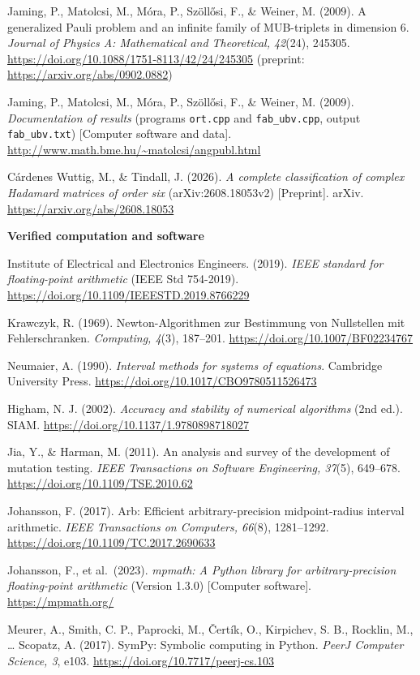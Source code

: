 \documentclass[
  11pt,
]{article}
\begin{document}
Jaming, P., Matolcsi, M., Móra, P., Szöllősi, F., \& Weiner, M. (2009).
A generalized Pauli problem and an infinite family of MUB-triplets in
dimension 6. \emph{Journal of Physics A: Mathematical and Theoretical,
42}(24), 245305. \url{https://doi.org/10.1088/1751-8113/42/24/245305}
(preprint: \url{https://arxiv.org/abs/0902.0882})

Jaming, P., Matolcsi, M., Móra, P., Szöllősi, F., \& Weiner, M. (2009).
\emph{Documentation of results} (programs \texttt{ort.cpp} and
\texttt{fab\_ubv.cpp}, output \texttt{fab\_ubv.txt}) {[}Computer
software and data{]}.
\url{http://www.math.bme.hu/~matolcsi/angpubl.html}

Cárdenes Wuttig, M., \& Tindall, J. (2026). \emph{A complete
classification of complex Hadamard matrices of order six}
(arXiv:2608.18053v2) {[}Preprint{]}. arXiv.
\url{https://arxiv.org/abs/2608.18053}

\textbf{Verified computation and software}

Institute of Electrical and Electronics Engineers. (2019). \emph{IEEE
standard for floating-point arithmetic} (IEEE Std 754-2019).
\url{https://doi.org/10.1109/IEEESTD.2019.8766229}

Krawczyk, R. (1969). Newton-Algorithmen zur Bestimmung von Nullstellen
mit Fehlerschranken. \emph{Computing, 4}(3), 187--201.
\url{https://doi.org/10.1007/BF02234767}

Neumaier, A. (1990). \emph{Interval methods for systems of equations}.
Cambridge University Press.
\url{https://doi.org/10.1017/CBO9780511526473}

Higham, N. J. (2002). \emph{Accuracy and stability of numerical
algorithms} (2nd ed.). SIAM.
\url{https://doi.org/10.1137/1.9780898718027}

Jia, Y., \& Harman, M. (2011). An analysis and survey of the development
of mutation testing. \emph{IEEE Transactions on Software Engineering,
37}(5), 649--678. \url{https://doi.org/10.1109/TSE.2010.62}

Johansson, F. (2017). Arb: Efficient arbitrary-precision midpoint-radius
interval arithmetic. \emph{IEEE Transactions on Computers, 66}(8),
1281--1292. \url{https://doi.org/10.1109/TC.2017.2690633}

Johansson, F., et al.~(2023). \emph{mpmath: A Python library for
arbitrary-precision floating-point arithmetic} (Version 1.3.0)
{[}Computer software{]}. \url{https://mpmath.org/}

Meurer, A., Smith, C. P., Paprocki, M., Čertík, O., Kirpichev, S. B.,
Rocklin, M., \ldots{} Scopatz, A. (2017). SymPy: Symbolic computing in
Python. \emph{PeerJ Computer Science, 3}, e103.
\url{https://doi.org/10.7717/peerj-cs.103}
\end{document}

